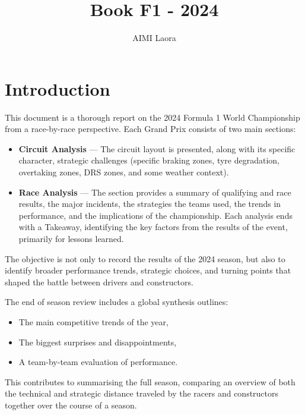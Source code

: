 \documentclass{article}
\title{Book F1 - 2024}
\author{AIMI Laora}
\date{}
\begin{document}
\maketitle


\section*{Introduction}

This document is a thorough report on the 2024 Formula 1 World Championship from a race-by-race perspective. Each Grand Prix consists of two main sections:

\begin{itemize}
    \item \textbf{Circuit Analysis} — The circuit layout is presented, along with its specific character, strategic challenges (specific braking zones, tyre degradation, overtaking zones, DRS zones, and some weather context).
    \item \textbf{Race Analysis} — The section provides a summary of qualifying and race results, the major incidents, the strategies the teams used, the trends in performance, and the implications of the championship. Each analysis ends with a Takeaway, identifying the key factors from the results of the event, primarily for lessons learned.
\end{itemize}

The objective is not only to record the results of the 2024 season, but also to identify broader
performance trends, strategic choices, and turning points that shaped the battle between drivers
and constructors.

The end of season review includes a global synthesis outlines:
\begin{itemize}
    \item The main competitive trends of the year,
    \item The biggest surprises and disappointments,
    \item A team-by-team evaluation of performance.
\end{itemize}

This contributes to summarising the full season, comparing an overview of both the technical and strategic distance traveled by the racers and constructors together over the course of a season.



























\end{document}
